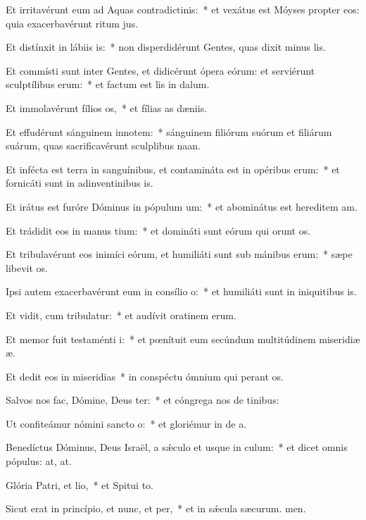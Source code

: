 \item Et irritavérunt eum ad Aquas contradictinis:~* et vexátus est Móyses propter eos: quia exacerbavérunt ritum jus.
\item Et distínxit in lábiis is:~* non disperdidérunt Gentes, quas dixit minus lis.
\item Et commísti sunt inter Gentes, et didicérunt ópera eórum: et serviérunt sculptílibus erum:~* et factum est lis in dalum.
\item Et immolavérunt fílios os,~* et fílias as dæniis.
\item Et effudérunt sánguinem innotem:~* sánguinem filiórum suórum et filiárum suárum, quas sacrificavérunt sculplibus naan.
\item Et infécta est terra in sanguínibus, et contamináta est in opéribus erum:~* et fornicáti sunt in adinventinibus is.
\item Et irátus est furóre Dóminus in pópulum um:~* et abominátus est hereditem am.
\item Et trádidit eos in manus tium:~* et domináti sunt eórum qui orunt os.
\item Et tribulavérunt eos inimíci eórum, et humiliáti sunt sub mánibus erum:~* sæpe libevit os.
\item Ipsi autem exacerbavérunt eum in consílio o:~* et humiliáti sunt in iniquitibus is.
\item Et vidit, cum tribulatur:~* et audívit oratinem erum.
\item Et memor fuit testaménti i:~* et pœnítuit eum secúndum multitúdinem miseridiæ æ.
\item Et dedit eos in miseridias~* in conspéctu ómnium qui perant os.
\item Salvos nos fac, Dómine, Deus ter:~* et cóngrega nos de tinibus:
\item Ut confiteámur nómini sancto o:~* et gloriémur in de a.
\item Benedíctus Dóminus, Deus Israël, a sǽculo et usque in culum:~* et dicet omnis pópulus: at, at.
\item Glória Patri, et lio,~* et Spitui to.
\item Sicut erat in princípio, et nunc, et per,~* et in sǽcula sæcurum. men.
